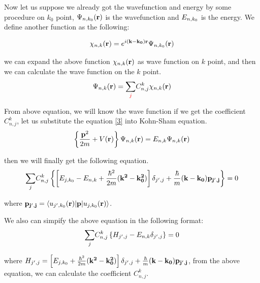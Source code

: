 \documentclass[a4paper]{report}
\begin{document}
Now let us suppose we already got the wavefunction and energy by some procedure on $k_0$ point, $\wfbloch<n><k_0>$ is the wavefunction and $\ebloch<n><k_0>$ is the energy.
We define another function as the following:

\begin{equation}\label{2}
\chikp<n><k> = \expg<(k-k_0)> \wfbloch<n><k_0>
\end{equation}





 we can expand the above function $\chikp<n><k> $ as wave function on $k$ point, and then we can calculate the wave function on the $k$ point.
\begin{equation}\label{3}
\wfbloch<n><k> =  {\sum\limits_{\color{red} j}} C_{n,j}^{k} \chikp<n><k> 
\end{equation}



From above equation, we will know the wave function if we get the coefficient $C_{n,j}^{k}$, let us substitute the equation \ref{3} into Kohn-Sham equation.
\begin{equation}\label{4}
\left\{ \frac {{\bf p}^2} {2m} + V({\bf r}) \right\} \wfbloch<n><k> = \ebloch<n><k> \wfbloch<n><k>
\end{equation} 






then we will finally get the following equation.
\begin{equation}\label{5}
{\sum\limits_{j}}  C_{n,j}^{k} \left \{  \left [  \ebloch<j><k_0> -  \ebloch<n><k>  + \frac{{\hbar}^2}{2m} {\bf (k^2-k_0^2)}    \right ] \delta_{j',j} + \frac{\hbar}{m} {\bf(k-k_0)} {\bf p_{j',j}} \right \} = 0
\end{equation}

where ${\bf p_{j',j}} = \langle \ubloch<j'><k_0>| {\bf p} | \ubloch<j><k_0>  \rangle $.
 
We also can simpify the above equation in the following format:
\begin{equation}\label{6}
{\sum\limits_{j}} C_{n,j}^{k} \left \{ H_{j',j}- \ebloch<n><k> \delta_{j',j} \right \} =0
\end{equation}

where $H_{j',j} = \left [  \ebloch<j><k_0>  + \frac{{\hbar}^2}{2m} {\bf (k^2-k_0^2)}    \right ] \delta_{j',j} + \frac{\hbar}{m} {\bf(k-k_0)} {\bf p_{j',j}}$, from the above equation, we 
can calculate the coefficient $ C_{n,j}^{k}$.
\end{document}
